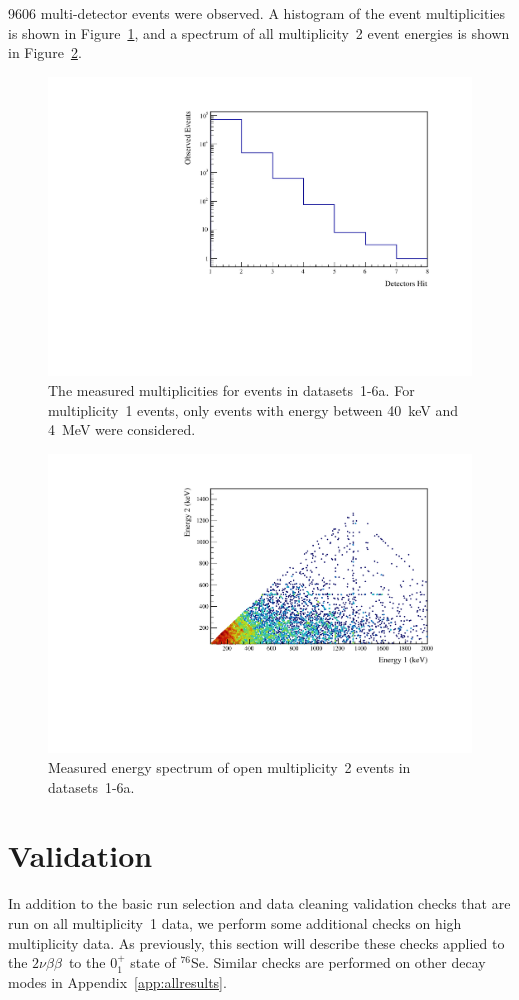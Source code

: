 \documentclass[notitlepage,rmp,aps,10pt]{revtex4-1}
\newcommand{\tnbb}{${2 \nu \beta \beta}$}
\newcommand{\iso}[2]{$^{#1}$#2}
\newcommand{\Se}[1]{\iso{#1}{Se}}
\newcommand{\SP}[3]{$#1^{#2}_{#3}$}
\begin{document}
9606 multi-detector events were observed.
A histogram of the event multiplicities is shown in Figure~\ref{fig:datamult}, and a spectrum of all multiplicity~2 event energies is shown in Figure~\ref{fig:data2D}.
\begin{figure}[h]
  \centering
  \includegraphics[width=.6\linewidth]{DataMultiplicity}
  \caption[Measured event multiplicities]{\label{fig:datamult}
    The measured multiplicities for events in datasets~1-6a. For multiplicity~1 events, only events with energy between 40~keV and 4~MeV were considered.
  }
\end{figure}
\begin{figure}[h]
  \centering
  \includegraphics[width=.8\linewidth]{Data2D}
  \caption[Measured energy spectrum of multiplicity~2 events]{\label{fig:data2D}
    Measured energy spectrum of open multiplicity~2 events in datasets~1-6a.
  }
\end{figure}

\section{Validation}
In addition to the basic run selection and data cleaning validation checks that are run on all multiplicity~1 data, we perform some additional checks on high multiplicity data.
As previously, this section will describe these checks applied to the \tnbb\ to the \SP{0}{+}{1} state of \Se{76}.
Similar checks are performed on other decay modes in Appendix~\ref{app:allresults}.
\end{document}
